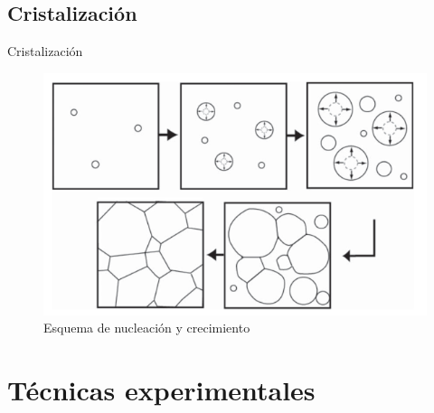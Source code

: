 \documentclass[11pt]{beamer}
\begin{document}
	\subsection{Cristalización}
		\begin{frame}{Cristalización}
			\begin{figure}
				\includegraphics[scale=0.3]{img/cristalization.png}
				\caption*{Esquema de nucleación y crecimiento}
			\end{figure}
		\end{frame}

\section{Técnicas experimentales}
\end{document}
